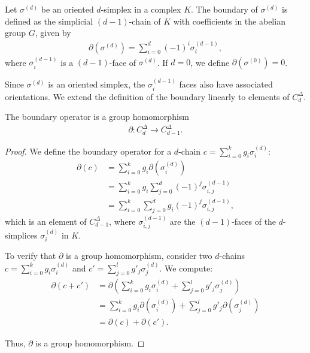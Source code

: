 \begin{definition}[Boundary]{\cite[p.106]{hatcher2005algebraic}} 
Let \( \sigma^{(d)} \) be an oriented \( d \)-simplex in a complex \( K \). The boundary of \( \sigma^{(d)} \) is defined as the simplicial \( (d-1) \)-chain of \( K \) with coefficients in the abelian group \( G \), given by
\begin{align}
\partial(\sigma^{(d)}) = \sum_{i=0}^{d} (-1)^{i} \sigma^{(d-1)}_{i},
\end{align}
where \( \sigma^{(d-1)}_{i} \) is a \( (d-1) \)-face of \( \sigma^{(d)} \). If \( d = 0 \), we define \( \partial(\sigma^{(0)}) = 0 \).
\end{definition}

Since \( \sigma^{(d)} \) is an oriented simplex, the \( \sigma^{(d-1)}_{i} \) faces also have associated orientations. We extend the definition of the boundary linearly to elements of \( C^{\Delta}_{d} \).

\begin{lemma}
	The boundary operator is a group homomorphism
	\begin{align}
		\partial: C^{\Delta}_{d} \to C^{\Delta}_{d-1}.
	\end{align}
\end{lemma}

\begin{proof}
We define the boundary operator for a \( d \)-chain \( c = \sum_{i=0}^{k} g_{i} \sigma_{i}^{(d)} \):
\begin{align}
\partial(c) &= \sum_{i=0}^{k} g_{i} \partial(\sigma_{i}^{(d)}) \\
&= \sum_{i=0}^{k} g_{i} \sum_{j=0}^{d} (-1)^{j} \sigma_{i,j}^{(d-1)} \\
&= \sum_{i=0}^{k} \sum_{j=0}^{d} g_{i} (-1)^{j} \sigma_{i,j}^{(d-1)},
\end{align}
which is an element of \( C^{\Delta}_{d-1} \), where \( \sigma_{i,j}^{(d-1)} \) are the \( (d-1) \)-faces of the \( d \)-simplices \( \sigma_{i}^{(d)} \) in \( K \).

To verify that \( \partial \) is a group homomorphism, consider two \( d \)-chains \( c = \sum_{i=0}^{k} g_{i} \sigma_{i}^{(d)} \) and \( c' = \sum_{j=0}^{l} g'_{j} \sigma_{j}^{(d)} \). We compute:
\begin{align}
\partial(c + c') &= \partial\left( \sum_{i=0}^{k} g_{i} \sigma_{i}^{(d)} + \sum_{j=0}^{l} g'_{j} \sigma_{j}^{(d)} \right) \\
&= \sum_{i=0}^{k} g_{i} \partial(\sigma_{i}^{(d)}) + \sum_{j=0}^{l} g'_{j} \partial(\sigma_{j}^{(d)}) \\
&= \partial(c) + \partial(c').
\end{align}

Thus, \( \partial \) is a group homomorphism.
\end{proof}

